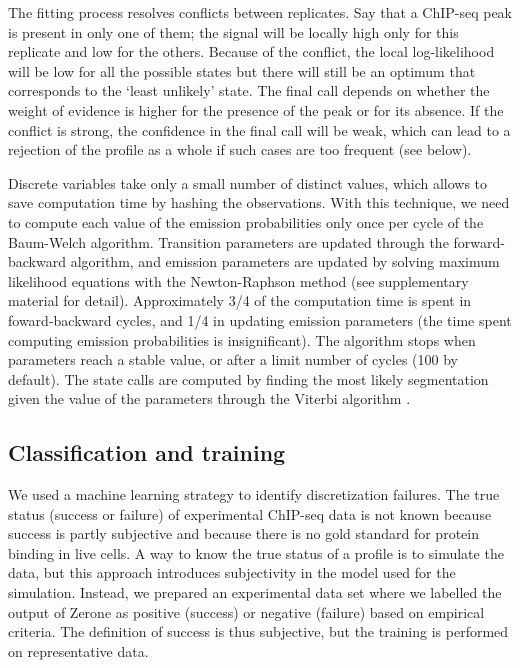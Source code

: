\documentclass{bioinfo}
\begin{document}
\begin{methods}
The fitting process resolves conflicts between replicates. Say that
a ChIP-seq peak is present in only one of them; the signal
will be locally high only for this replicate and low for the others.
Because of the conflict, the local log-likelihood will be low for
all the possible states but there will still be an optimum that
corresponds to the `least unlikely' state. The final call depends on
whether the weight of evidence is higher for the presence of the
peak or for its absence. If the conflict is strong, the confidence
in the final call will be weak, which can lead to a rejection of
the profile as a whole if such cases are too frequent (see below).

Discrete variables take only a small number of distinct values, which
allows to save computation time by hashing the observations. With this
technique, we need to compute each value of the emission probabilities
only once per cycle of the Baum-Welch algorithm. Transition parameters
are updated through the forward-backward algorithm, and emission
parameters are updated by solving maximum likelihood equations
with the Newton-Raphson method (see supplementary material for detail).
Approximately 3/4 of the computation time is spent in foward-backward
cycles, and 1/4 in updating emission parameters (the time spent computing
emission probabilities is insignificant). The algorithm stops when
parameters reach a stable value, or after a limit number of cycles (100
by default). The state calls are computed by finding the most likely
segmentation given the value of the parameters through the Viterbi
algorithm \citep{1054010}.


\subsection{Classification and training}
\label{sub:training}
We used a machine learning strategy to identify discretization
failures. The true status (success or failure) of experimental ChIP-seq
data is not known because success is partly subjective and because
there is no gold standard for protein binding in live cells. A way to
know the true status of a profile is to simulate the data, but this
approach introduces subjectivity in the model used for the simulation.
Instead, we prepared an experimental data set where we labelled the
output of Zerone as positive (success) or negative (failure) based
on empirical criteria. The definition of success is thus subjective,
but the training is performed on representative data.


\end{methods}
\end{document}
